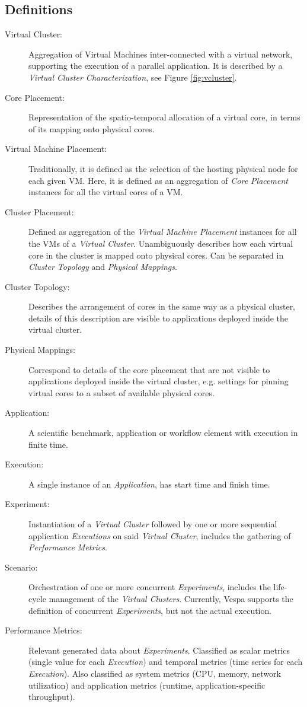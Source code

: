 \documentclass[11pt]{article}
\begin{document}
\subsection{Definitions}


\begin{description}
  \item [Virtual Cluster:] Aggregation of Virtual Machines inter-connected with a virtual network, supporting the execution of a parallel application. It is described by a \emph{Virtual Cluster Characterization}, see Figure \ref{fig:vcluster}.
  \item [Core Placement:] Representation of the spatio-temporal allocation of a virtual core, in terms of its mapping onto physical cores. 
  \item [Virtual Machine Placement:] Traditionally, it is defined as the selection of the hosting physical node for each given VM. Here, it is defined as an aggregation of \emph{Core Placement} instances for all the virtual cores of a VM.
  \item [Cluster Placement:] Defined as aggregation of the \emph{Virtual Machine Placement} instances for all the VMs of a \emph{Virtual Cluster}. Unambiguously describes how each virtual core in
  the cluster is mapped onto physical cores. Can be separated in \emph{Cluster Topology} and \emph{Physical Mappings}.
  \item [Cluster Topology:] Describes the arrangement of cores in the same way as a physical cluster, details of this description are visible to applications deployed inside the virtual cluster. 
  \item [Physical Mappings:] Correspond to details of the core placement that are not visible to applications deployed inside the virtual cluster, e.g. settings for pinning virtual cores to a subset of available physical cores.
  \item [Application:] A scientific benchmark, application or workflow element with execution in finite time.
  \item [Execution:] A single instance of an \emph{Application}, has start time and finish time.
  \item [Experiment:] Instantiation of a \emph{Virtual Cluster} followed by one or more sequential application \emph{Executions} on said \emph{Virtual Cluster}, includes the gathering of \emph{Performance Metrics}.
  \item [Scenario:] Orchestration of one or more concurrent \emph{Experiments}, includes the life-cycle management of the \emph{Virtual Clusters}. Currently, Vespa supports the definition of concurrent \emph{Experiments}, but not the actual execution. %
  \item [Performance Metrics:] Relevant generated data about \emph{Experiments}. Classified as scalar metrics (single value for each \emph{Execution}) and temporal metrics (time series for each \emph{Execution}). Also classified as system metrics (CPU, memory, network utilization) and application metrics (runtime, application-specific throughput).
\end{description}
\end{document}
